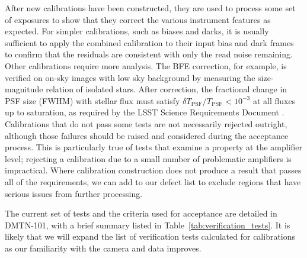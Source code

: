After new calibrations have been constructed, they are used to process some set of exposures to show that they correct the various instrument features as expected.
For simpler calibrations, such as biases and darks, it is usually sufficient to apply the combined calibration to their input bias and dark frames to confirm that the residuals are consistent with only the read noise remaining.
Other calibrations require more analysis.
The BFE correction, for example, is verified on on-sky images with low sky background by measuring the size-magnitude relation of isolated stars.
After correction, the fractional change in PSF size (FWHM) with stellar flux must satisfy $\delta T_{\mathrm{PSF}}/T_{\mathrm{PSF}} < 10^{-3}$ at all fluxes up to saturation, as required by the LSST Science Requirements Document \citep{LPM-17}.
Calibrations that do not pass some tests are not necessarily rejected outright, although those failures should be raised and considered during the acceptance process.
This is particularly true of tests that examine a property at the amplifier level; rejecting a calibration due to a small number of problematic amplifiers is impractical.
Where calibration construction does not produce a result that passes all of the requirements, we can add to our defect list to exclude regions that have serious issues from further processing.

The current set of tests and the criteria used for acceptance are detailed in DMTN-101, with a brief summary listed in Table~\ref{tab:verification_tests}.
It is likely that we will expand the list of verification tests calculated for calibrations as our familiarity with the camera and data improves.

